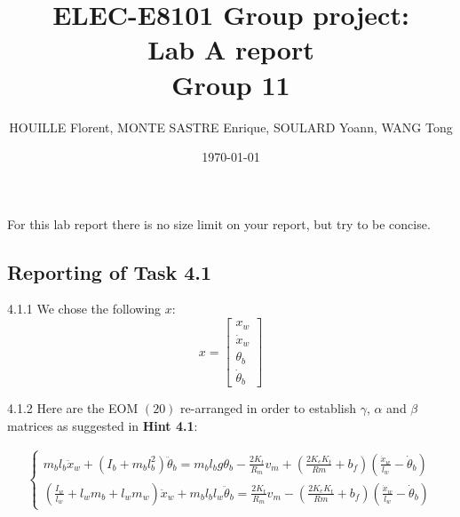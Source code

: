 \documentclass[11pt]{article}
\title{\Huge ELEC-E8101 Group project: \\ Lab A report \\ Group 11}
\date{\today}
\author{HOUILLE Florent, MONTE SASTRE Enrique, SOULARD Yoann, WANG Tong}
\begin{document}
\maketitle

\begin{instructions}
For this lab report there is no size limit on your report, but try to be concise.	
\end{instructions}

\subsection*{Reporting of Task 4.1}

4.1.1 We chose the following $x$:
\begin{equation*}
x=
	\begin{bmatrix}
	x_w\\
	\dot x_w\\
	\theta_b\\
	\dot \theta_b
	\end{bmatrix}
\end{equation*}

4.1.2 Here are the EOM $(20)$ re-arranged in order to establish $\gamma$, $\alpha$ and $\beta$ matrices as suggested in \textbf{Hint 4.1}:

\begin{align*}
\begin{cases}
m_bl_b\ddot x_w + (I_b+m_b l_b^2)\ddot\theta_b =
m_bl_bg\theta_b-\frac{2K_t}{R_m}v_m+(\frac{2K_eK_t}{Rm}+b_f)(\frac{\dot x_w}{l_w}-\dot\theta_b)\\
(\frac{I_w}{l_w}+l_wm_b+l_wm_w)\ddot x_w + m_bl_bl_w\ddot\theta_b =
\frac{2K_t}{R_m}v_m-(\frac{2K_eK_t}{Rm}+b_f)(\frac{\dot x_w}{l_w}-\dot\theta_b)
\end{cases}
\end{align*}
\end{document}
